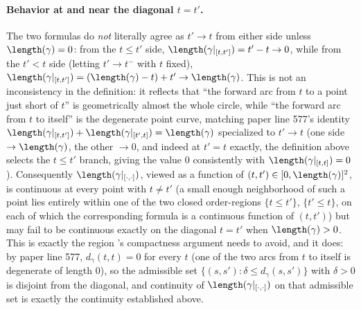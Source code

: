 \begin{definition}
  \paragraph{Behavior at and near the diagonal $t=t'$.} The two formulas do \emph{not} literally
  agree as $t'\to t$ from either side unless $\length(\gamma)=0$: from the $t\le t'$ side,
  $\length(\gamma|_{[t,t']}) = t'-t \to 0$, while from the $t'<t$ side (letting $t'\to t^-$ with $t$
  fixed), $\length(\gamma|_{[t,t']}) = (\length(\gamma)-t)+t' \to \length(\gamma)$. This is not an
  inconsistency in the definition: it reflects that ``the forward arc from $t$ to a point just
  short of $t$'' is geometrically almost the whole circle, while ``the forward arc from $t$ to
  itself'' is the degenerate point curve, matching paper line 577's identity
  $\length(\gamma|_{[t,t']})+\length(\gamma|_{[t',t]})=\length(\gamma)$ specialized to $t'\to t$ (one
  side $\to \length(\gamma)$, the other $\to 0$, and indeed at $t'=t$ exactly, the definition above
  selects the $t\le t'$ branch, giving the value $0$ consistently with $\length(\gamma|_{[t,t]})=0$).
  Consequently $\length(\gamma|_{[\cdot,\cdot]})$, viewed as a function of $(t,t') \in
  [0,\length(\gamma)]^2$, is continuous at every point with $t\ne t'$ (a small enough neighborhood of
  such a point lies entirely within one of the two closed order-regions $\{t\le t'\}$, $\{t'\le t\}$,
  on each of which the corresponding formula is a continuous function of $(t,t')$) but may fail to be continuous exactly on the
  diagonal $t=t'$ when $\length(\gamma)>0$. This is exactly the region 's
  compactness argument needs to avoid, and it does: by paper line 577, $d_\gamma(t,t)=0$ for every
  $t$ (one of the two arcs from $t$ to itself is degenerate of length $0$), so the admissible set
  $\{(s,s') : \delta \le d_\gamma(s,s')\}$ with $\delta>0$ is disjoint from the diagonal, and
  continuity of $\length(\gamma|_{[\cdot,\cdot]})$ on that admissible set is exactly the continuity
  established above.
\end{definition}
